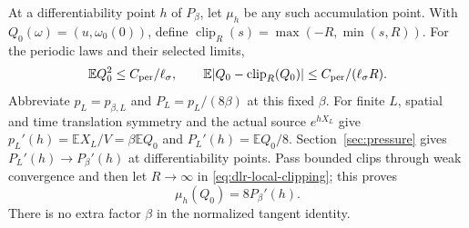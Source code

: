 \documentclass[11pt]{article}
\numberwithin{equation}{section}
\theoremstyle{definition}
\newcommand{\E}{\mathbb E}
\begin{document}
At a differentiability point $h$ of $P_\beta$, let $\mu_h$ be any such
accumulation point.  With $Q_0(\omega)=(u,\omega_0(0))$, define
$\operatorname{clip}_R(s)=\max(-R,\min(s,R))$.  For the periodic laws and
their selected limits,
\begin{equation}
 \E Q_0^2\leq C_{\rm per}/\ell_\sigma,\qquad
 \E|Q_0-\operatorname{clip}_R(Q_0)|
 \leq C_{\rm per}/(\ell_\sigma R).
 \label{eq:dlr-local-clipping}
\end{equation}
Abbreviate $p_L=p_{\beta,L}$ and $P_L=p_L/(8\beta)$ at this fixed
$\beta$.  For finite $L$, spatial and time translation symmetry and the actual
source $e^{hX_L}$ give
$p_L'(h)=\E X_L/V=\beta\E Q_0$ and
$P_L'(h)=\E Q_0/8$.  Section~\ref{sec:pressure} gives
$P_L'(h)\to P_\beta'(h)$ at differentiability points.  Pass bounded
clips through weak convergence and then let $R\to\infty$ in
\eqref{eq:dlr-local-clipping}; this proves
\begin{equation}
 \mu_h(Q_0)=8P_\beta'(h). \label{eq:tangent-identity}
\end{equation}
There is no extra factor $\beta$ in the normalized tangent identity.
\end{document}
